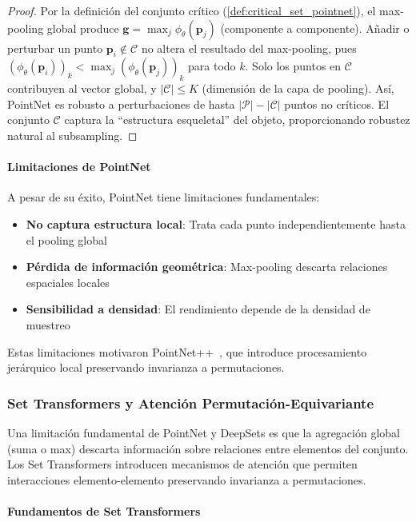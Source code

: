 \begin{proof}
Por la definición del conjunto crítico (\autoref{def:critical_set_pointnet}), el max-pooling global produce $\mathbf{g} = \max_j \phi_\theta(\mathbf{p}_j)$ (componente a componente). Añadir o perturbar un punto $\mathbf{p}_i \notin \mathcal{C}$ no altera el resultado del max-pooling, pues $(\phi_\theta(\mathbf{p}_i))_k < \max_j (\phi_\theta(\mathbf{p}_j))_k$ para todo $k$. Solo los puntos en $\mathcal{C}$ contribuyen al vector global, y $|\mathcal{C}| \leq K$ (dimensión de la capa de pooling). Así, PointNet es robusto a perturbaciones de hasta $|\mathcal{P}| - |\mathcal{C}|$ puntos no críticos. El conjunto $\mathcal{C}$ captura la ``estructura esqueletal'' del objeto, proporcionando robustez natural al subsampling.
\end{proof}

\paragraph{Limitaciones de PointNet}

A pesar de su éxito, PointNet tiene limitaciones fundamentales:

\begin{itemize}
    \item \textbf{No captura estructura local}: Trata cada punto independientemente hasta el pooling global
    \item \textbf{Pérdida de información geométrica}: Max-pooling descarta relaciones espaciales locales
    \item \textbf{Sensibilidad a densidad}: El rendimiento depende de la densidad de muestreo
\end{itemize}

Estas limitaciones motivaron PointNet++~\citep{qi2017pointnetplus}, que introduce procesamiento jerárquico local preservando invarianza a permutaciones.

\subsubsection{Set Transformers y Atención Permutación-Equivariante}

Una limitación fundamental de PointNet y DeepSets es que la agregación global (suma o max) descarta información sobre relaciones entre elementos del conjunto. Los Set Transformers introducen mecanismos de atención que permiten interacciones elemento-elemento preservando invarianza a permutaciones.

\paragraph{Fundamentos de Set Transformers}

